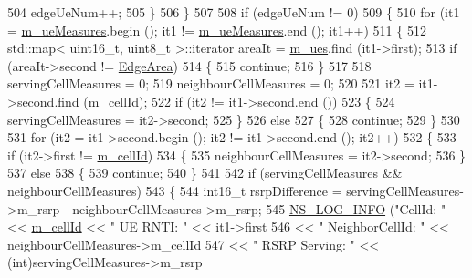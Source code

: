 \begin{DoxyCode}
504           edgeUeNum++;
505         \}
506     \}
507 
508   \textcolor{keywordflow}{if} (edgeUeNum != 0)
509     \{
510       \textcolor{keywordflow}{for} (it1 = \hyperlink{classns3_1_1LteFfrDistributedAlgorithm_a7c74c81039a56db450fc726ab9d26d2c}{m\_ueMeasures}.begin (); it1 != \hyperlink{classns3_1_1LteFfrDistributedAlgorithm_a7c74c81039a56db450fc726ab9d26d2c}{m\_ueMeasures}.end (); it1++)
511         \{
512           std::map< uint16\_t, uint8\_t >::iterator areaIt = \hyperlink{classns3_1_1LteFfrDistributedAlgorithm_a23b1424852e6736058ca1671be44fe5c}{m\_ues}.find (it1->first);
513           \textcolor{keywordflow}{if} (areaIt->second != \hyperlink{classns3_1_1LteFfrDistributedAlgorithm_a8ff512b8e668c4e56fc5e1bb6c577ad6acfb0117a4a8824dd5c7a08029b774ed3}{EdgeArea})
514             \{
515               \textcolor{keywordflow}{continue};
516             \}
517 
518           servingCellMeasures = 0;
519           neighbourCellMeasures = 0;
520 
521           it2 = it1->second.find (\hyperlink{classns3_1_1LteFfrAlgorithm_a0d6bc37b568679f27a18808d9cb36803}{m\_cellId});
522           \textcolor{keywordflow}{if} (it2 != it1->second.end ())
523             \{
524               servingCellMeasures = it2->second;
525             \}
526           \textcolor{keywordflow}{else}
527             \{
528               \textcolor{keywordflow}{continue};
529             \}
530 
531           \textcolor{keywordflow}{for} (it2 = it1->second.begin (); it2 != it1->second.end (); it2++)
532             \{
533               \textcolor{keywordflow}{if} (it2->first != \hyperlink{classns3_1_1LteFfrAlgorithm_a0d6bc37b568679f27a18808d9cb36803}{m\_cellId})
534                 \{
535                   neighbourCellMeasures = it2->second;
536                 \}
537               \textcolor{keywordflow}{else}
538                 \{
539                   \textcolor{keywordflow}{continue};
540                 \}
541 
542               \textcolor{keywordflow}{if} (servingCellMeasures && neighbourCellMeasures)
543                 \{
544                   int16\_t rsrpDifference = servingCellMeasures->m\_rsrp - neighbourCellMeasures->m\_rsrp;
545                   \hyperlink{group__logging_gafbd73ee2cf9f26b319f49086d8e860fb}{NS\_LOG\_INFO} (\textcolor{stringliteral}{"CellId: "} << \hyperlink{classns3_1_1LteFfrAlgorithm_a0d6bc37b568679f27a18808d9cb36803}{m\_cellId} << \textcolor{stringliteral}{" UE RNTI: "} << it1->first
546                                           << \textcolor{stringliteral}{" NeighborCellId: "} << neighbourCellMeasures->m\_cellId
547                                           << \textcolor{stringliteral}{" RSRP Serving: "} << (\textcolor{keywordtype}{int})servingCellMeasures->m\_rsrp

\end{DoxyCode}
